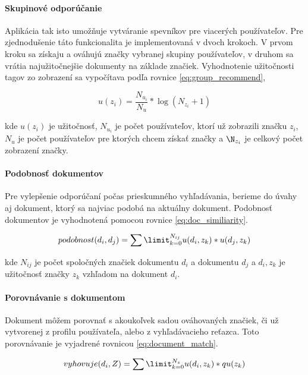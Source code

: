 \paragraph{Skupinové odporúčanie}

Aplikácia tak isto umožňuje vytváranie spevníkov pre viacerých používateľov. Pre zjednodušenie
táto funkcionalita je implementovaná v dvoch krokoch. V prvom kroku sa získaju a ováhujú značky
vybranej skupiny používateľov, v druhom sa vrátia najužitočnejšie dokumenty na základe značiek.
Vyhodnotenie užitočnosti tagov zo zobrazení sa vypočítava podľa rovnice \ref{eq:group_recommend},

\begin{equation}\label{eq:group_recommend}
u(z_i) = \frac{N_{u_i}}{N_u} * \log (N_{z_i} + 1)
\end{equation}

kde \(u(z_i)\) je užitočnosť, \(N_{u_i}\) je počet používateľov, ktorí už zobrazili značku
\(z_i\), \(N_u\) je počet používateľov pre ktorých chcem získať značky a \(\N_{z_i}\) je 
celkový počet zobrazení značky.

\paragraph{Podobnosť dokumentov}

Pre vylepšenie odporúčaní počas prieskumného vyhľadávania, berieme do úvahy aj dokument, ktorý
sa najviac podobá na aktuálny dokument. Podobnosť dokumentov je vyhodnotená pomocou rovnice
\ref{eq:doc_similiarity}.

\begin{equation}\label{eq:doc_similiarity}
podobnost(d_i, d_j) = \sum\limit_{k = 0}^{N_{ij}} u(d_i, z_k) * u(d_j, z_k)
\end{equation}

kde \(N_{ij}\) je počet spoločných značiek dokumentu \(d_i\) a dokumentu \(d_j\) a 
\(d_i, z_k\) je užitočnosť značky \(z_k\) vzhľadom na dokument \(d_i\).

\paragraph{Porovnávanie s dokumentom}

Dokument môžem porovnať s akoukoľvek sadou ováhovaných značiek, či už vytvorenej z profilu 
používateľa, alebo z vyhľadávacieho reťazca. Toto porovnávanie je vyjadrené rovnicou
\ref{eq:document_match}.

\begin{equation}\label{eq:document_match}
vyhovuje(d_i, Z) = \sum\limit_{k = 0}^{N_{z}} u(d_i, z_k) * qu(z_k)
\end{equation}


